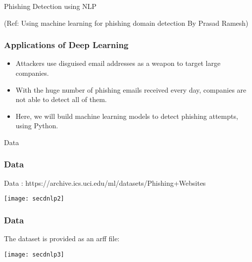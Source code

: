 \begin{frame}
  \begin{center}
    {\Large Phishing Detection using NLP}
	
	\tiny{(Ref: Using machine learning for phishing domain detection By Prasad Ramesh)}
  \end{center}
\end{frame}

\begin{frame}[fragile]\frametitle{Applications of Deep Learning}
	\begin{itemize}
	\item  Attackers use disguised email addresses as a weapon to target large companies. 
	\item With the huge number of phishing emails received every day, companies are not able to detect all of them. 
	\item Here, we will build machine learning models to detect phishing attempts, using Python.
	\end{itemize}
\end{frame}

\begin{frame}
  \begin{center}
    {\Large Data}
  \end{center}
\end{frame}


\begin{frame}[fragile]\frametitle{Data}
Data : https://archive.ics.uci.edu/ml/datasets/Phishing+Websites

	    \begin{center}
     \texttt{[image: secdnlp2]}      
     \end{center}
\end{frame}

\begin{frame}[fragile]\frametitle{Data}
The dataset is provided as an arff file:

	    \begin{center}
     \texttt{[image: secdnlp3]}      
     \end{center}
\end{frame}

